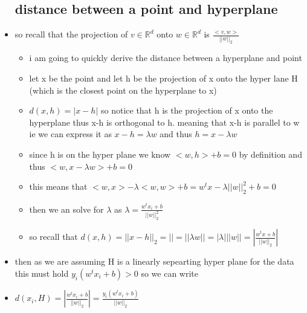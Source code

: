 \documentclass{article}
\begin{document}
\begin{itemize}
\subsection{distance between a point and hyperplane}
\item so recall that the projection of $v\in\mathbb{R}^{d}$ onto $w\in\mathbb{R}^{d}$ is $\frac{<v,w>}{||w||_{2}}$
\begin{itemize}
    \item i am going to quickly derive the distance between a hyperplane and point 
    \item  let x be the point and let h be the projection of x onto the hyper lane H (which is the closest point on the hyperplane to x)
    \item $d(x,h)=|x-h|$ so notice that h is the projection of x onto the hyperplane thus x-h is orthogonal to h. meaning that x-h is parallel to w ie we can express it as $x-h=\lambda w$ and thus $h=x-\lambda w$
    \item since h is on the hyper plane we know $<w,h>+b=0$ by definition and thus $<w,x-\lambda w>+b=0$
    \item this means that $<w,x>-\lambda<w,w>+b=w^{t}x-\lambda||w||_{2}^{2}+b=0$
    \item then we an solve for $\lambda$ as $\lambda=\frac{w^{t}x_i+b}{||w||_{2}^{2}}$
    \item so recall that $d(x,h)=||x-h||_{2}=||=||\lambda w||=|\lambda| ||w||=|\frac{w^{t}x+b}{||w||_{2}}|$
\end{itemize}
\item then as we are assuming H is a linearly sepearting hyper plane for the data this must hold $y_i(w^{t}x_i+b)>0$  so  we can write 
\item $d(x_i,H)=|\frac{w^{t}x_i+b}{||w||_2}|=\frac{y_{i}(w^tx_i+b)}{||w||_{2}}$

\end{itemize}
\end{document}
